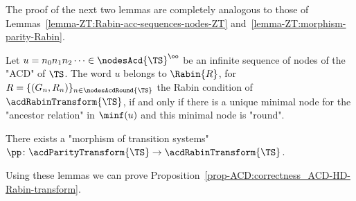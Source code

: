 \documentclass{theoretics}
\begin{document}
The proof of the next two lemmas are completely analogous to those of Lemmas~\ref{lemma-ZT:Rabin-acc-sequences-nodes-ZT} and~\ref{lemma-ZT:morphism-parity-Rabin}.
\begin{lemma}\label{lemma-acd:Rabin-acc-sequences-nodes-ACD}
	Let $u = n_0n_1n_2\dots \in \nodesAcd{\TS}^\oo$ be an infinite sequence of nodes of the "ACD" of $\TS$. The word $u$ belongs to $\Rabin{R}$, for $R = \{(G_n,R_n)\}_{n\in\nodesAcdRound{\TS}}$ the Rabin condition of $\acdRabinTransform{\TS}$, if and only if there is a unique minimal node for the "ancestor relation" in $\minf(u)$ and this minimal node is "round".
\end{lemma}

\begin{lemma}\label{lemma-acd:morphism-Parity-Rabin}
	There exists a "morphism of transition systems" $\pp\colon \acdParityTransform{\TS} \to \acdRabinTransform{\TS}$.
\end{lemma}


Using these lemmas we can prove Proposition~\ref{prop-ACD:correctness_ACD-HD-Rabin-transform}.
\end{document}

